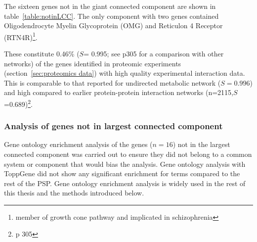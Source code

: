 The sixteen genes not in the giant connected component are shown in table~\ref{table:notinLCC}. The only component with two genes contained Oligodendrocyte Myelin Glycoprotein (OMG) and Reticulon 4 Receptor (RTN4R)\footnote{member of growth cone pathway and implicated in schizophrenia}. 

 

These constitute 0.46\% ($S$= 0.995; see\cite{newman2018networks} p305 for a comparison with other networks) of the genes identified in proteomic experiments (section~\ref{sec:proteomics data}) with high quality experimental interaction data. This is comparable to that reported for undirected metabolic network ($S=0.996$) and high compared to earlier protein-protein interaction networks (n=2115,$S$=0.689)\cite{newman2018networks}\footnote{p 305}.

\subsubsection{Analysis of genes not in largest connected component}
\label{sec:analysis of genes not in largest component}

Gene ontology enrichment analysis of the genes ($n=16$) not in the largest connected component was carried out to ensure they did not belong to a common system or component that would bias the analysis. Gene ontology analysis with ToppGene did not show any significant enrichment for terms compared to the rest of the PSP. Gene ontology enrichment analysis is widely used in the rest of this thesis and the methods introduced below.

